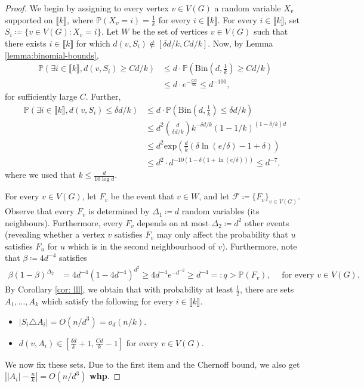 \documentclass[notitlepage]{scrartcl}
\renewcommand{\exp}{\text{exp}}
\newcommand{\br}[1]{\llbracket{#1}\rrbracket}
\begin{document}
\begin{proof}[Proof]
We begin by assigning to every vertex $v\in V(G)$ a random variable $X_v$ supported on $\br{k}$, where $\mathbb{P}(X_v = i)=\frac{1}{k}$ for every $i \in \br{k}$. For every $i \in \br{k}$, set $S_i \coloneqq \{v\in V(G)\colon X_v=i\}$. Let $W$ be the set of vertices $v \in V(G)$ such that there exists $i\in \br{k}$ for which $d(v,S_i)\notin[\delta d/k, Cd/k]$. Now, by Lemma \ref{lemma:binomial-bounds},
\begin{align*}
    \mathbb{P}\left(\exists i\in \br{k}, d(v,S_i)\ge Cd/k\right)&\le d\cdot \mathbb{P}\left(\text{Bin}\left(d,\frac{1}{k}\right)\ge Cd/k\right)\\
    &\le d\cdot e^{-\frac{Cd}{4k}}\le d^{-100},
\end{align*}
for sufficiently large $C$. Further, \begin{align*}
    \mathbb{P}\left(\exists i\in \br{k}, d(v,S_i)\le \delta d/k\right)
    &\le d\cdot \mathbb{P}\left(\text{Bin}\left(d,\frac{1}{k}\right)\le \delta d/k\right)\\
    &\le d^2{\binom{d}{\delta d/k}}k^{-\delta d/k}(1-1/k)^{(1-\delta/k)d}\\
    &\leq d^2\exp\left(\frac{d}{k}(\delta\ln (e/\delta)-1+\delta)\right)\\
    &\leq d^2\cdot d^{-10(1-\delta(1+\ln(e/\delta)))}\le d^{-7},
\end{align*}
where we used that $k\le \frac{d}{10\log d}$. 

For every $v\in V(G)$, let $F_v$ be the event that $v\in W$, and let $\mathcal{F}\coloneqq \{F_v\}_{v\in V(G)}$. Observe that every $F_v$ is determined by $\Delta_1\coloneqq d$ random variables (its neighbours). Furthermore, every $F_v$ depends on at most $\Delta_2\coloneqq d^2$ other events (revealing whether a vertex $v$ satisfies $F_v$ may only affect the probability that $u$ satisfies $F_u$ for $u$ which is in the second neighbourhood of $v$). Furthermore, note that $\beta\coloneqq 4d^{-4}$ satisfies 
\begin{align*}
    \beta(1-\beta)^{\Delta_2}&=4d^{-4}(1-4d^{-4})^{d^2}
    \ge 4d^{-4}e^{-d^{-2}}
    \ge d^{-4}=:q>\mathbb{P}(F_v),\quad\text{ for every $v\in V(G)$}.
\end{align*}
By Corollary \ref{cor: lll}, we obtain that with probability at least $\frac{1}{2}$, there are sets $A_1,\ldots, A_k$ which satisfy the following for every $i \in \br{k}$. 
\begin{itemize}
    \item $\left|S_i\triangle A_i\right|=O(n/d^3)=o_d(n/k)$.
    \item $d(v,A_i)\in \left[\frac{\delta d}{k}+1,\frac{Cd}{k}-1\right]$ for every $v \in V(G)$.
\end{itemize}
We now fix these sets. Due to the first item and the Chernoff bound, we also get $\left||A_i|-\frac{n}{k}\right|=O(n/d^{3})$ \textbf{whp}.



\end{proof}
\end{document}
